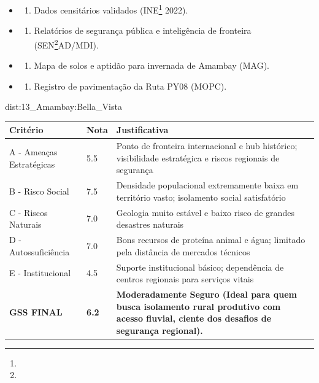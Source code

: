 {\begin{itemize}
\tightlist
\item
  \begin{enumerate}
  \def\labelenumi{\arabic{enumi})}
  \tightlist
  \item
    Dados censitários validados (INE\footnote{\fineINE} 2022).
  \end{enumerate}
\item
  \begin{enumerate}
  \def\labelenumi{\arabic{enumi})}
  \setcounter{enumi}{1}
  \tightlist
  \item
    Relatórios de segurança pública e inteligência de fronteira
    (SEN\footnote{\fineSEN}AD/\allowbreak MDI).
  \end{enumerate}
\item
  \begin{enumerate}
  \def\labelenumi{\arabic{enumi})}
  \setcounter{enumi}{2}
  \tightlist
  \item
    Mapa de solos e aptidão para invernada de Amambay (MAG).
  \end{enumerate}
\item
  \begin{enumerate}
  \def\labelenumi{\arabic{enumi})}
  \setcounter{enumi}{3}
  \tightlist
  \item
    Registro de pavimentação da Ruta PY08 (MOPC).
  \end{enumerate}
\end{itemize}}{dist:13_Amambay:Bella_Vista}
\begin{table}[ht!]
\small \begin{tabular}{p{3.0cm}p{0.8cm}p{6.0cm}} \toprule
\textbf{Critério} & \textbf{Nota} & \textbf{Justificativa} \\ \midrule
A - Ameaças Estratégicas & 5.5 & Ponto de fronteira internacional e hub histórico; visibilidade estratégica e riscos regionais de segurança \\
B - Risco Social & 7.5 & Densidade populacional extremamente baixa em território vasto; isolamento social satisfatório \\
C - Riscos Naturais & 7.0 & Geologia muito estável e baixo risco de grandes desastres naturais \\
D - Autossuficiência & 7.0 & Bons recursos de proteína animal e água; limitado pela distância de mercados técnicos \\
E - Institucional & 4.5 & Suporte institucional básico; dependência de centros regionais para serviços vitais \\
\midrule \textbf{GSS FINAL} & \textbf{6.2} & \textbf{Moderadamente Seguro (Ideal para quem busca isolamento rural produtivo com acesso fluvial, ciente dos desafios de segurança regional).} \\ \bottomrule \end{tabular}
\end{table}
